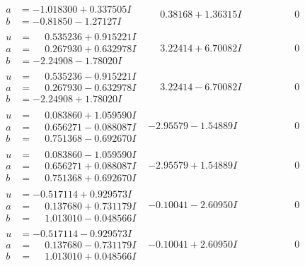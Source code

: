 \documentclass[1p]{elsarticle_modified}
\theoremstyle{definition}
\begin{document}
$$\begin{array}{c|c|c}
\begin{aligned}
a &= -1.018300 + 0.337505 I \\
b &= -0.81850 - 1.27127 I\end{aligned}
 & \phantom{-}0.38168 + 1.36315 I & \phantom{-0.000000 } 0 \\ \hline\begin{aligned}
u &= \phantom{-}0.535236 + 0.915221 I \\
a &= \phantom{-}0.267930 + 0.632978 I \\
b &= -2.24908 - 1.78020 I\end{aligned}
 & \phantom{-}3.22414 + 6.70082 I & \phantom{-0.000000 } 0 \\ \hline\begin{aligned}
u &= \phantom{-}0.535236 - 0.915221 I \\
a &= \phantom{-}0.267930 - 0.632978 I \\
b &= -2.24908 + 1.78020 I\end{aligned}
 & \phantom{-}3.22414 - 6.70082 I & \phantom{-0.000000 } 0 \\ \hline\begin{aligned}
u &= \phantom{-}0.083860 + 1.059590 I \\
a &= \phantom{-}0.656271 - 0.088087 I \\
b &= \phantom{-}0.751368 - 0.692670 I\end{aligned}
 & -2.95579 - 1.54889 I & \phantom{-0.000000 } 0 \\ \hline\begin{aligned}
u &= \phantom{-}0.083860 - 1.059590 I \\
a &= \phantom{-}0.656271 + 0.088087 I \\
b &= \phantom{-}0.751368 + 0.692670 I\end{aligned}
 & -2.95579 + 1.54889 I & \phantom{-0.000000 } 0 \\ \hline\begin{aligned}
u &= -0.517114 + 0.929573 I \\
a &= \phantom{-}0.137680 + 0.731179 I \\
b &= \phantom{-}1.013010 - 0.048566 I\end{aligned}
 & -0.10041 - 2.60950 I & \phantom{-0.000000 } 0 \\ \hline\begin{aligned}
u &= -0.517114 - 0.929573 I \\
a &= \phantom{-}0.137680 - 0.731179 I \\
b &= \phantom{-}1.013010 + 0.048566 I\end{aligned}
 & -0.10041 + 2.60950 I & \phantom{-0.000000 } 0\\

\end{array}$$
\end{document}
